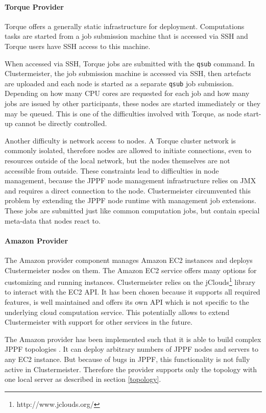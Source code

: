 \documentclass[english]{uzhpub}
\begin{document}
\paragraph{Torque Provider}
\label{implementation-torque}

Torque offers a generally static infrastructure for deployment. Computations tasks are started from a job submission machine that is accessed via SSH and Torque users have SSH access to this machine.

When accessed via SSH, Torque jobs are submitted with the \texttt{qsub} command. In Clustermeister, the job submission machine is accessed via SSH, then artefacts are uploaded and each node is started as a separate \texttt{qsub} job submission. Depending on how many CPU cores are requested for each job and how many jobs are issued by other participants, these nodes are started immediately or they may be queued. This is one of the difficulties involved with Torque, as node start-up cannot be directly controlled.

Another difficulty is network access to nodes. A Torque cluster network is commonly isolated, therefore nodes are allowed to initiate connections, even to resources outside of the local network, but the nodes themselves are not accessible from outside. These constraints lead to difficulties in node management, because the JPPF node management infrastructure relies on JMX and requires a direct connection to the node. Clustermeister circumvented this problem by extending the JPPF node runtime with management job extensions. These jobs are submitted just like common computation jobs, but contain special meta-data that nodes react to.

\paragraph{Amazon Provider}
The Amazon provider component manages Amazon EC2 instances and deploys Clustermeister nodes on them. The Amazon EC2 service offers many options for customizing and running instances. Clustermeister relies on the jClouds\footnote{http://www.jclouds.org/} library to interact with the EC2 API. It has been chosen because it supports all required features, is well maintained and offers its own API which is not specific to the underlying cloud computation service. This potentially allows to extend Clustermeister with support for other services in the future.

The Amazon provider has been implemented such that it is able to build complex JPPF topologies \cite{jppf-topo, jppf-topo-blog}. It can deploy arbitrary numbers of JPPF nodes and servers to any EC2 instance. But because of bugs in JPPF, this functionality is not fully active in Clustermeister. Therefore the provider supports only the topology with one local server as described in section \ref{topology}.
\end{document}
